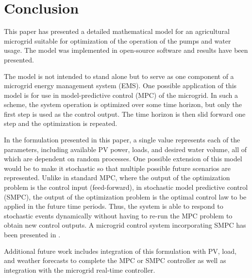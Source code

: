\section{Conclusion}
\label{sec:conclusion}

This paper has presented a detailed mathematical model for an agricultural microgrid suitable for optimization of the operation of the pumps and water usage. The model was implemented in open-source software and results have been presented.

The model is not intended to stand alone but to serve as one component of a microgrid energy management system (EMS).
One possible application of this model is for use in model-predictive control (MPC) of the microgrid.
In such a scheme, the system operation is optimized over some time horizon, but only the first step is used as the control output.
The time horizon is then slid forward one step and the optimization is repeated.

In the formulation presented in this paper, a single value represents each of the parameters, including available PV power, loads, and desired water volume, all of which are dependent on random processes.
One possible extension of this model would be to make it stochastic so that multiple possible future scenarios are represented.
Unlike in standard MPC, where the output of the optimization problem is the control input (feed-forward), in stochastic model predictive control (SMPC), the output of the optimization problem is the optimal control law to be applied in the future time periods\cite{mesbah2016}. Thus, the system is able to respond to stochastic events dynamically without having to re-run the MPC problem to obtain new control outputs.
A microgrid control system incorporating SMPC has been presented in \cite{cominesi2015}.

Additional future work includes integration of this formulation with PV, load, and weather forecasts to complete the MPC or SMPC controller as well as integration with the microgrid real-time controller.